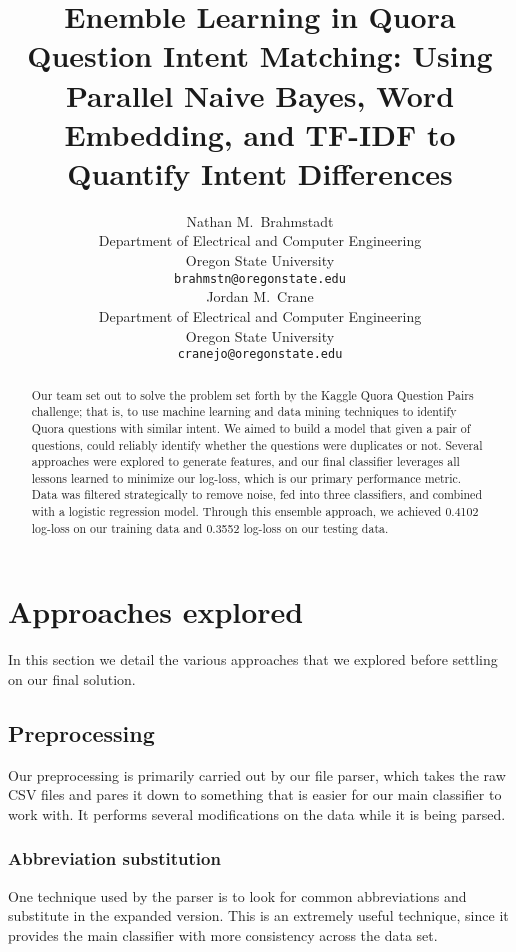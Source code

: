\documentclass{article}
\title{Enemble Learning in Quora Question Intent Matching:
Using Parallel Naive Bayes, Word Embedding, and TF-IDF to Quantify Intent Differences}
\author{
    Nathan M.~Brahmstadt \\
  Department of Electrical and Computer Engineering\\
  Oregon State University\\
  \texttt{brahmstn@oregonstate.edu} \\
  \And
  Jordan M.~Crane \\
  Department of Electrical and Computer Engineering \\
  Oregon State University \\
  \texttt{cranejo@oregonstate.edu} \\
}
\begin{document}

\maketitle

\begin{abstract}
    Our team set out to solve the problem set forth by the Kaggle Quora Question
    Pairs challenge; that is, to use machine learning and data mining techniques
    to identify Quora questions with similar intent. We aimed to build a model
    that given a pair of questions, could reliably identify whether the
    questions were duplicates or not. Several approaches were explored to
    generate features, and our final classifier leverages all lessons learned
    to minimize our log-loss, which is our primary performance metric. Data was
    filtered strategically to remove noise, fed into three classifiers,
    and combined with a logistic regression model. Through this ensemble
    approach, we achieved 0.4102 log-loss on our training data and 0.3552
    log-loss on our testing data.
\end{abstract}

\section{Approaches explored}

In this section we detail the various approaches that we explored before
settling on our final solution.

\subsection{Preprocessing}

Our preprocessing is primarily carried out by our file parser, which takes the
raw CSV files and pares it down to something that is easier for our main
classifier to work with. It performs several modifications on the data while it
is being parsed.

\subsubsection{Abbreviation substitution}

One technique used by the parser is to look for common abbreviations and
substitute in the expanded version. This is an extremely useful technique, since
it provides the main classifier with more consistency across the data set.
\end{document}
